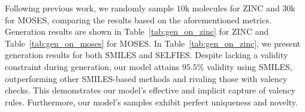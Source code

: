 \documentclass[accepted]{uai2023} %
\begin{document}
Following previous work, we randomly sample $10$k molecules for ZINC and $30$k for MOSES, comparing the results based on the aforementioned metrics. Generation results are shown in Table~\ref{tab:gen_on_zinc} for ZINC and Table~\ref{tab:gen_on_moses} for MOSES.
In Table~\ref{tab:gen_on_zinc}, we present generation results for both SMILES and SELFIES. Despite lacking a validity constraint during generation, our model attains $95.5\%$ validity using SMILES, outperforming other SMILES-based methods and rivaling those with valency checks. This demonstrates our model's effective and implicit capture of valency rules. Furthermore, our model's samples exhibit perfect uniqueness and novelty.
\begin{table}[H]
\caption{Unconditional generation on ZINC. $^\star$ denotes valency check. \citep{jin2018junction,you2018graph,madhawa2019graphnvp,shi2020graphaf,luo2021graphdf,gomez2018automatic,kusner2017grammar} }
\label{tab:gen_on_zinc}
\end{table}
\end{document}
